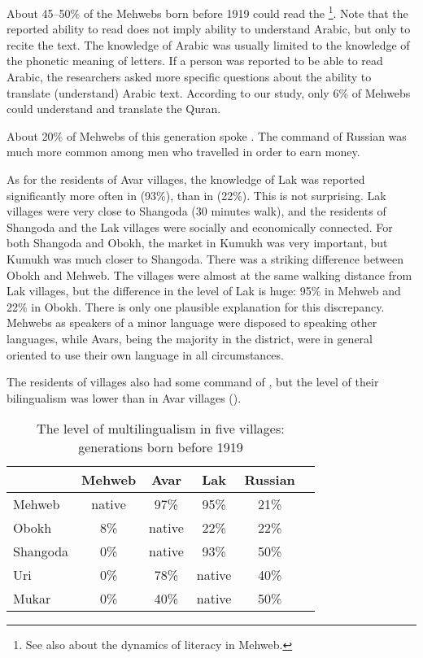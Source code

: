 \documentclass[output=paper]{langsci/langscibook}
\begin{document}
About 45–50\% of the Mehwebs born before 1919 could read the
\footnote{See also \citet{kozhukhar-barylnikova2013} about the dynamics
  of literacy in Mehweb.}. Note that the reported ability to read does
not imply ability to understand Arabic, but only to recite the text. The
knowledge of Arabic was usually limited to the knowledge of the phonetic
meaning of letters. If a person was reported to be able to read Arabic,
the researchers asked more specific questions about the ability to
translate (understand) Arabic text. According to our study, only 6\% of
Mehwebs could understand and translate the Quran.

About 20\% of Mehwebs of this generation spoke . The command of
Russian was much more common among men who travelled in order to earn
money.

As for the residents of Avar villages, the knowledge of Lak was reported
significantly more often in  (93\%), than in  (22\%). This
is not surprising. Lak villages were very close to Shangoda (30 minutes
walk), and the residents of Shangoda and the Lak villages were socially
and economically connected. For both Shangoda and Obokh, the market in
Kumukh was very important, but Kumukh was much closer to Shangoda. There
was a striking difference between Obokh and Mehweb. The villages were
almost at the same walking distance from Lak villages, but the
difference in the level of Lak is huge: 95\% in Mehweb and 22\% in
Obokh. There is only one plausible explanation for this discrepancy.
Mehwebs as speakers of a minor language were disposed to speaking other
languages, while Avars, being the majority in the district, were in
general oriented to use their own language in all circumstances.

The residents of  villages also had some command of , but the
level of their bilingualism was lower than in Avar villages ().

\begin{table}[hb]
\begin{tabular}{@{}lccccc@{}}
\toprule
& {Mehweb} & {Avar} & {Lak} & {Russian}\tabularnewline \midrule
{Mehweb} & native & 97\% & 95\% & 21\%\tabularnewline
{Obokh} & 8\% & native & 22\% & 22\%\tabularnewline
{Shangoda} & 0\% & native & 93\% & 50\%\tabularnewline
{Uri} & 0\% & 78\% & native & 40\%\tabularnewline
{Mukar} & 0\% & 40\% & native & 50\%\tabularnewline
\bottomrule
\end{tabular}

\caption{The level of multilingualism in five villages: generations born
before 1919}
\label{Table2}
\end{table}
\end{document}
